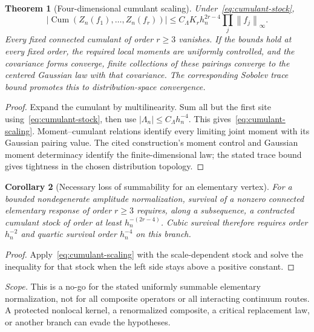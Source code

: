 \documentclass[11pt,a4paper,oneside]{book}
\theoremstyle{plain}
\newtheorem{theorem}{Theorem}[chapter]
\newtheorem{corollary}[theorem]{Corollary}
\theoremstyle{definition}
\theoremstyle{remark}
\newcommand{\Cum}{\operatorname{Cum}}
\newcommand{\norm}[1]{\left\lVert#1\right\rVert}
\newcommand{\abs}[1]{\left\lvert#1\right\rvert}
\newcommand{\src}[2]{\cite{#1}}
\newcommand{\scope}[1]{\par\smallskip\noindent\textit{Scope.} #1\par\smallskip}
\begin{document}
\begin{theorem}[Four-dimensional cumulant scaling]
\label{thm:gaussianization}
Under~\eqref{eq:cumulant-stock},
\begin{equation}
 \abs{\Cum(Z_n(f_1),\ldots,Z_n(f_r))}
 \le C_\Lambda K_rh_n^{2r-4}\prod_j\norm{f_j}_\infty.
 \label{eq:cumulant-scaling}
\end{equation}
Every fixed connected cumulant of order $r\ge3$ vanishes. If the bounds hold at every fixed order, the required local moments are uniformly controlled, and the covariance forms converge, finite collections of these pairings converge to the centered Gaussian law with that covariance. The corresponding Sobolev trace bound promotes this to distribution-space convergence.
\end{theorem}
\begin{proof}
Expand the cumulant by multilinearity. Sum all but the first site using~\eqref{eq:cumulant-stock}, then use $|\Lambda_n|\le C_\Lambda h_n^{-4}$. This gives~\eqref{eq:cumulant-scaling}. Moment--cumulant relations identify every limiting joint moment with its Gaussian pairing value. The cited construction's moment control and Gaussian moment determinacy identify the finite-dimensional law; the stated trace bound gives tightness in the chosen distribution topology.
\end{proof}
\src{R18}{thm:v18v35-cumulant-scaling,thm:v18v35-gaussianization}

\begin{corollary}[Necessary loss of summability for an elementary vertex]
\label{cor:survival-threshold}
For a bounded nondegenerate amplitude normalization, survival of a nonzero connected elementary response of order $r\ge3$ requires, along a subsequence, a contracted cumulant stock of order at least $h_n^{-(2r-4)}$. Cubic survival therefore requires order $h_n^{-2}$ and quartic survival order $h_n^{-4}$ on this branch.
\end{corollary}
\begin{proof}
Apply~\eqref{eq:cumulant-scaling} with the scale-dependent stock and solve the inequality for that stock when the left side stays above a positive constant.
\end{proof}
\src{R18}{thm:v18v36-survival-threshold}
\scope{This is a no-go for the stated uniformly summable elementary normalization, not for all composite operators or all interacting continuum routes. A protected nonlocal kernel, a renormalized composite, a critical replacement law, or another branch can evade the hypotheses.}
\end{document}
